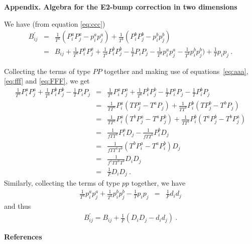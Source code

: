 \begin{center}
{\bf       Appendix. Algebra for the E2-bump correction in two dimensions}
\end{center}

We have (from equation \ref{eq:ccc})
\begin{eqnarray*}
B^{\prime}_{ij} & = & \frac {1}{T^a} (P^a_i P^a_j - p^a_i p^a_j) +
                      \frac {1}{T^b} (P^b_i P^b_j - p^b_i p^b_j) \\
    & = & B_{ij} + \frac {1}{T^a} P^a_i P^a_j +
                   \frac {1}{T^b} P^b_i P^b_j -
                   \frac {1}{T} P_i P_j -
                   \frac {1}{T^a} p^a_i p^a_j -
                   \frac {1}{T^b} p^b_i p^b_j) +
                   \frac {1}{T} p_i p_j \ .
\end{eqnarray*}

Collecting the terms of type $PP$ together and making use of
equations~\ref{eq:aaa}, \ref{eq:fff} and \ref{eq:FFF}, we get
\begin{eqnarray*}
     \frac {1}{T^a} P^a_i P^a_j
   + \frac {1}{T^b} P^b_i P^b_j
   - \frac {1}{T} P_i P_j
& = & \frac {1}{T^a} P^a_i P^a_j + \frac {1}{T^b} P^b_i P^b_j
    - \frac {1}{T} P^a_i P_j     - \frac {1}{T} P^b_i P_j \\
& = & \frac {1}{TT^a} P^a_i (T P^a_j - T^a P_j)
    + \frac {1}{TT^b} P^b_i (T P^b_j - T^b P_j) \\
& = & \frac {1}{TT^a} P^a_i (T^b P^a_j - T^a P^b_j)
    + \frac {1}{TT^b} P^b_i (T^a P^b_j - T^b P^a_j) \\
& = & \frac {1}{fTT^a} P^a_i D_j - \frac {1}{fTT^b} P^b_i D_j \\
& = & \frac {1}{fTT^aT^b} (T^b P^a_i - T^a P^b_i) D_j \\
& = & \frac {1}{f^2TT^aT^b} D_i D_j \\
& = & \frac {1}{F} D_i D_j \ .
\end{eqnarray*}
Similarly, collecting the terms of type $pp$ together, we have
\begin{eqnarray*}
     \frac {1}{T^a} p^a_i p^a_j
   + \frac {1}{T^b} p^b_i p^b_j
   - \frac {1}{T} p_i p_j
& = & \frac {1}{F} d_i d_j
\end{eqnarray*}
and thus
\begin{eqnarray*}
B^{\prime}_{ij} = B_{ij} + \frac {1} {F} (D_i D_j - d_i d_j) \ .
\end{eqnarray*}


\newpage
\begin{center}
{\bf                                References}
\end{center}

